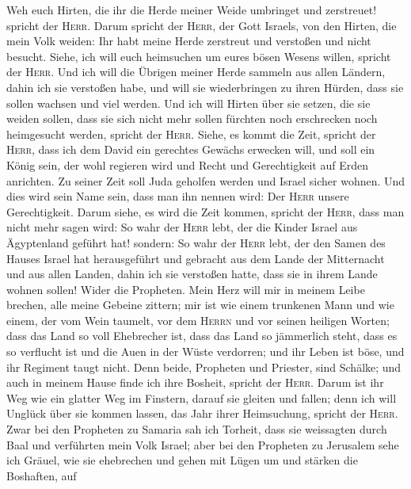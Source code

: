  Weh euch Hirten, die ihr die Herde meiner Weide umbringet
und zerstreuet! spricht der \textsc{Herr}.  Darum spricht
der \textsc{Herr}, der Gott Israels, von den Hirten, die mein Volk
weiden: Ihr habt meine Herde zerstreut und verstoßen und nicht besucht.
Siehe, ich will euch heimsuchen um eures bösen Wesens willen, spricht
der \textsc{Herr}.  Und ich will die Übrigen meiner Herde
sammeln aus allen Ländern, dahin ich sie verstoßen habe, und will sie
wiederbringen zu ihren Hürden, dass sie sollen wachsen und viel werden.
 Und ich will Hirten über sie setzen, die sie weiden
sollen, dass sie sich nicht mehr sollen fürchten noch erschrecken noch
heimgesucht werden, spricht der \textsc{Herr}.  Siehe, es
kommt die Zeit, spricht der \textsc{Herr}, dass ich dem David ein
gerechtes Gewächs erwecken will, und soll ein König sein, der wohl
regieren wird und Recht und Gerechtigkeit auf Erden anrichten.
 Zu seiner Zeit soll Juda geholfen werden und Israel
sicher wohnen. Und dies wird sein Name sein, dass man ihn nennen wird:
Der \textsc{Herr} unsere Gerechtigkeit.  Darum siehe, es
wird die Zeit kommen, spricht der \textsc{Herr}, dass man nicht mehr
sagen wird: So wahr der \textsc{Herr} lebt, der die Kinder Israel aus
Ägyptenland geführt hat!  sondern: So wahr der
\textsc{Herr} lebt, der den Samen des Hauses Israel hat herausgeführt
und gebracht aus dem Lande der Mitternacht und aus allen Landen, dahin
ich sie verstoßen hatte, dass sie in ihrem Lande wohnen sollen!
 Wider die Propheten. Mein Herz will mir in meinem Leibe
brechen, alle meine Gebeine zittern; mir ist wie einem trunkenen Mann
und wie einem, der vom Wein taumelt, vor dem \textsc{Herrn} und vor
seinen heiligen Worten;  dass das Land so voll Ehebrecher
ist, dass das Land so jämmerlich steht, dass es so verflucht ist und die
Auen in der Wüste verdorren; und ihr Leben ist böse, und ihr Regiment
taugt nicht.  Denn beide, Propheten und Priester, sind
Schälke; und auch in meinem Hause finde ich ihre Bosheit, spricht der
\textsc{Herr}.  Darum ist ihr Weg wie ein glatter Weg im
Finstern, darauf sie gleiten und fallen; denn ich will Unglück über sie
kommen lassen, das Jahr ihrer Heimsuchung, spricht der \textsc{Herr}.
 Zwar bei den Propheten zu Samaria sah ich Torheit, dass
sie weissagten durch Baal und verführten mein Volk Israel;
 aber bei den Propheten zu Jerusalem sehe ich Gräuel, wie
sie ehebrechen und gehen mit Lügen um und stärken die Boshaften, auf
